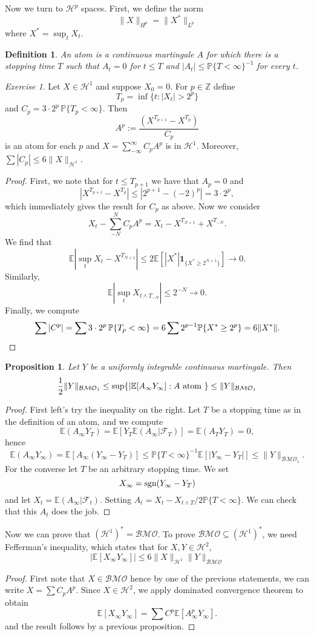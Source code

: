 \documentclass[11pt]{article}
\newtheorem{prop}[thm]{Proposition}
\newtheorem*{defn}{Definition}
\theoremstyle{remark}
\newtheorem{exr}{Exercise}
\newcommand{\calH}{\mathcal{H}}
\newcommand{\calF}{\mathcal{F}}
\newcommand{\1}{\textbf{1}}
\def\norm#1{\| #1  \|}
\newcommand{\bbZ}{\mathbb{Z}}
\newcommand{\bbP}{\mathbb{P}}
\newcommand{\bbE}{\mathbb{E}}
\begin{document}
\vspace{4mm}
\noindent Now we turn to $\calH^p$ spaces. First, we define the norm
\[
\norm{X}_{H^p} = \norm{X^*}_{L^p}
\]
where $X^* = \sup_t X_t$.
\begin{defn}
An atom is a continuous martingale $A$ for which there is a stopping time $T$ such that $A_t = 0$ for $t \leq T$ and $|A_t| \leq \bbP\{T < \infty\}^{-1}$ for every $t$.
\end{defn}
\begin{exr}
Let $X \in \mathcal{H}^1$ and suppose $X_0 = 0$. For $p \in \bbZ$ define
\[
T_p = \inf \{t : |X_t| > 2^p \}
\]
and $C_p = 3 \cdot 2^p\,\bbP \{T_p < \infty\}$. Then
\[
A^p := \frac{(X^{T_{p+1}} - X^{T_p})}{C_p}
\]
is an atom for each $p$ and $X = \sum_{- \infty}^\infty C_p A^p$ is in $\mathcal{H}^1$. Moreover, $\sum|C_p| \leq 6 \norm{X}_{\mathcal{H}^1}$.
\begin{proof}
First, we note that for $t \leq T_{p+1}$ we have that $A_p = 0$ and
\[
|X^{T_{p+1}} - X^{T_p}| \leq |2^{p+1} - (-2)^{p}| = 3 \cdot 2^p,
\]
which immediately gives the result for $C_p$ as above. Now we consider
\[
X_t - \sum_{- N}^N C_p A^p = X_t - X^{T_{N+1}} + X^{T_{-N}}.
\]
We find that
\[
\bbE |\sup_t X_t - X^{T_{N+1}}| \leq 2 \bbE[|X^*| \textbf{1}_{\{X^* \geq 2^{N+1}\}}] \to 0.
\]
Similarly,
\[
\bbE |\sup_t X_{t \wedge T_{-N}}| \leq 2^{-N} \to 0.
\]
Finally, we compute
\[
\sum |C^p| = \sum 3 \cdot 2^p\,\bbP \{T_p < \infty\} = 6 \sum 2^{p-1} \bbP \{X^* \geq 2^p \} = 6 \norm{X^*}. \qedhere
\]
\end{proof}
\begin{prop}
Let $Y$ be a uniformly integrable continuous martingale. Then
\[
\frac{1}{2}  \norm{Y}_{\mathcal{BMO}_1} \leq \sup\{ |\bbE[A_\infty Y_\infty] : A \textup{ atom }\} \leq \norm{Y}_{\mathcal{BMO}_1}
\]
\end{prop}
\begin{proof}
First left's try the inequality on the right. Let $T$ be a stopping time as in the definition of an atom, and we compute
\[
\bbE(A_\infty Y_T) = \bbE [Y_T \bbE(A_\infty |\calF_T)] = \bbE(A_T Y_T) = 0,
\]
hence
\[
\bbE(A_\infty Y_\infty) = \bbE[A_\infty(Y_\infty - Y_T)] \leq \bbP\{T < \infty\}^{-1}\bbE[|Y_\infty - Y_T|] \leq \norm{Y}_{\mathcal{BMO}_1}.
\]
For the converse let $T$ be an arbitrary stopping time. We set
\[
X_\infty = \textup{sgn}(Y_\infty - Y_T)
\]
and let $X_t = \bbE(A_\infty |\calF_t)$. Setting $A_t = X_t - X_{t \wedge T}/2 \bbP\{T < \infty\}$. We can check that this $A_t$ does the job.
\end{proof}
Now we can prove that $(\mathcal{H}^1)^* = \mathcal{BMO}$. To prove $\mathcal{BMO} \subseteq (\mathcal{H}^1)^*$, we need Fefferman's inequality, which states that for $X,Y \in \calH^2$,
\[
|\bbE[X_\infty Y_\infty]| \leq 6 \norm{X}_{\mathcal{H}^1} \norm{Y}_{\mathcal{BMO}}
\]
\begin{proof}
First note that $X \in \mathcal{BMO}$ hence by one of the previous statements, we can write $X = \sum C_p A^p$.  Since $X \in \calH^2$, we apply dominated convergence theorem to obtain
\[
\bbE[X_\infty Y_\infty] = \sum C^p \bbE[A_\infty^p Y_\infty].
\]
and the result follows by a previous proposition.


\end{proof}
\end{exr}
\end{document}

